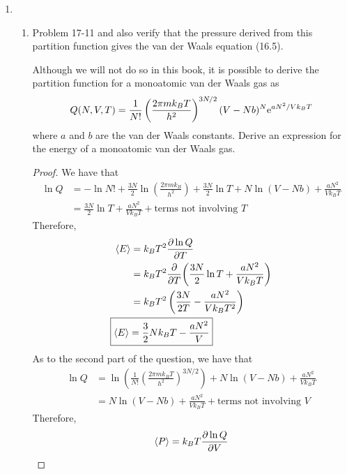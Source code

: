 \documentclass[../psets.tex]{subfiles}
\begin{document}
\begin{enumerate}
\begin{proof}
        so $\sigma_E/\prb{E}$ will also behave like $1/\sqrt{N}$ as $N\to\infty$ for this type of solid.
    \end{proof}
    \item 
    \begin{enumerate}
        \item Problem 17-11 and also verify that the pressure derived from this partition function gives the van der Waals equation (16.5).\par
        Although we will not do so in this book, it is possible to derive the partition function for a monoatomic van der Waals gas as
        \begin{equation*}
            Q(N,V,T) = \frac{1}{N!}\left( \frac{2\pi mk_BT}{h^2} \right)^{3N/2}(V-Nb)^N\e[aN^2/Vk_BT]
        \end{equation*}
        where $a$ and $b$ are the van der Waals constants. Derive an expression for the energy of a monoatomic van der Waals gas.
        \begin{proof}
            We have that
            \begin{align*}
                \ln Q &= -\ln N!+\frac{3N}{2}\ln\left( \frac{2\pi mk_B}{h^2} \right)+\frac{3N}{2}\ln T+N\ln(V-Nb)+\frac{aN^2}{Vk_BT}\\
                &= \frac{3N}{2}\ln T+\frac{aN^2}{Vk_BT}+\text{terms not involving }T
            \end{align*}
            Therefore,
            \begin{align*}
                \prb{E} &= k_BT^2\pdv{\ln Q}{T}\\
                &= k_BT^2\pdv{T}(\frac{3N}{2}\ln T+\frac{aN^2}{Vk_BT})\\
                &= k_BT^2\left( \frac{3N}{2T}-\frac{aN^2}{Vk_BT^2} \right)\\
                \Aboxed{\prb{E} &= \frac{3}{2}Nk_BT-\frac{aN^2}{V}}
            \end{align*}
            As to the second part of the question, we have that
            \begin{align*}
                \ln Q &= \ln\left( \frac{1}{N!}\left( \frac{2\pi mk_BT}{h^2} \right)^{3N/2} \right)+N\ln(V-Nb)+\frac{aN^2}{Vk_BT}\\
                &= N\ln(V-Nb)+\frac{aN^2}{Vk_BT}+\text{terms not involving }V
            \end{align*}
            Therefore,
            \begin{align*}
                \prb{P} &= k_BT\pdv{\ln Q}{V}\\

\end{align*}
\end{proof}
\end{enumerate}
\end{enumerate}
\end{document}
